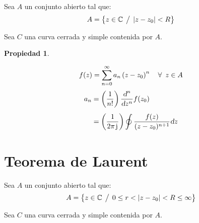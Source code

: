 \documentclass[a5paper,12pt,twoside]{book}
\newtheorem{prop}{{Propiedad}}[chapter]
\begin{document}
Sea $A$ un conjunto abierto tal que:
\begin{equation*}
    A = { \left\{ {z \in \mathbb{C} \hspace{1ex} \big/ \hspace{1ex} {\left| {z-z_0} \right|}<R} \right\} }
\end{equation*}

Sea $C$ una curva cerrada y simple contenida por $A$.

\begin{center}
    \def\svgwidth{0.6\linewidth}
    
\end{center}

\begin{mdframed}[style=PropertyFrame]
    \begin{prop}
    \end{prop}
    \begin{equation*}
        f(z) = \sum_{n=0}^\infty a_n \left(z-z_0\right)^n \quad \forall \enspace z \in A
    \end{equation*}
    \begin{align*}
        a_n &= \left( \frac{1}{n!} \right) \frac{\textsl{d}^n}{\textsl{d} z^n} f(z_0)
        \\[1ex]
        &= \left( \frac{1}{2 \pi \mkern2mu\mathrm{j}\mkern1mu} \right) \oint \frac{f(z)}{(z-z_0)^{n+1}} \textsl{d} z
    \end{align*}
\end{mdframed}


\section{Teorema de Laurent}
\label{sec:Laurent}

Sea $A$ un conjunto abierto tal que:
\begin{equation*}
    A = { \left\{ {z \in \mathbb{C} \hspace{1ex} \big/ \hspace{1ex} 0 \leq r< {\left| {z-z_0} \right|}<R \leq \infty} \right\} }
\end{equation*}

Sea $C$ una curva cerrada y simple contenida por $A$.

\begin{center}
    \def\svgwidth{0.6\linewidth}
    
\end{center}
\end{document}

